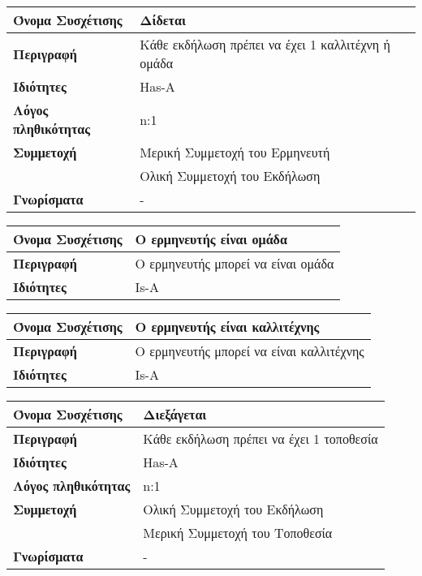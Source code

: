 \begin{center}
\begin{tabular}[]{|p{4cm}|p{10cm}|}
  \hline
  \textbf{Όνομα Συσχέτισης} & Δίδεται \\ \hline
  \textbf{Περιγραφή} & Κάθε εκδήλωση πρέπει να έχει 1 καλλιτέχνη ή ομάδα\\ \hline
  \textbf{Ιδιότητες} & Has-A  \\ \hline
  \textbf{Λόγος πληθικότητας} & n:1 \\ \hline
  \textbf{Συμμετοχή} & Μερική Συμμετοχή του Ερμηνευτή\\ \cline{2-2}
                     & Ολική Συμμετοχή του Εκδήλωση \\ \hline
  \textbf{Γνωρίσματα} & - \\ \hline
\end{tabular}
\vspace{0.3 cm}


\begin{tabular}[]{|p{4cm}|p{10cm}|}
  \hline
  \textbf{Όνομα Συσχέτισης} &Ο ερμηνευτής είναι ομάδα\\ \hline
  \textbf{Περιγραφή} & Ο ερμηνευτής μπορεί να είναι ομάδα\\ \hline
  \textbf{Ιδιότητες} & Is-A  \\ \hline
\end{tabular}
\vspace{0.3 cm}
\begin{tabular}[]{|p{4cm}|p{10cm}|}
  \hline
  \textbf{Όνομα Συσχέτισης} &Ο ερμηνευτής είναι καλλιτέχνης\\ \hline
  \textbf{Περιγραφή} & Ο ερμηνευτής μπορεί να είναι καλλιτέχνης\\ \hline
  \textbf{Ιδιότητες} & Is-A  \\ \hline
\end{tabular}
\vspace{0.3 cm}


\begin{tabular}[]{|p{4cm}|p{10cm}|}
  \hline
  \textbf{Όνομα Συσχέτισης} & Διεξάγεται\\ \hline
  \textbf{Περιγραφή} & Κάθε εκδήλωση πρέπει να έχει 1 τοποθεσία\\ \hline
  \textbf{Ιδιότητες} & Has-A \\ \hline
  \textbf{Λόγος πληθικότητας} & n:1 \\ \hline
  \textbf{Συμμετοχή} & Ολική Συμμετοχή του Εκδήλωση\\ \cline{2-2}
                     & Μερική Συμμετοχή του Τοποθεσία \\ \hline
  \textbf{Γνωρίσματα} & - \\ \hline
\end{tabular}
\vspace{0.3 cm}



\end{center}
